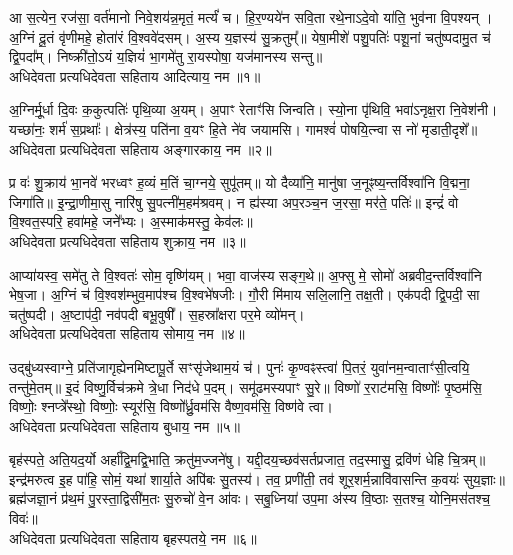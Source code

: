 

आ स॒त्येन॒ रज॑सा॒ वर्त॑मानो निवे॒शय॑न्न॒मृतं॒ मर्त्यं॑ च। हि॒र॒ण्यये॑न सवि॒ता रथे॒नाऽदे॒वो या॑ति॒ भुव॑ना वि॒पश्यन्। अ॒ग्निं दू॒तं वृ॑णीमहे॒ होता॑रं वि॒श्ववे॑दसम्। अ॒स्य य॒ज्ञस्य॑ सु॒क्रतुम्᳚॥ येषा॒मीशे॑ पशु॒पतिः॑ पशू॒नां चतु॑ष्पदामु॒त च॑ द्वि॒पदा᳚म्। निष्क्री॑तो॒ऽयं य॒ज्ञियं॑ भा॒गमे॑तु रा॒यस्पोषा॒ यज॑मानस्य सन्तु॥ \\
अधिदेवता प्रत्यधिदेवता सहिताय आदित्याय॒ नम॥१॥ 

अ॒ग्निर्मू॒र्धा दि॒वः क॒कुत्पतिः॑ पृथि॒व्या अ॒यम्। अ॒पाꣳ रेताꣳ॑सि जिन्वति। स्यो॒ना पृ॑थिवि॒ भवा॑ऽनृक्ष॒रा नि॒वेश॑नी। यच्छा॑नः॒ शर्म॑ स॒प्रथाः᳚। क्षेत्र॑स्य॒ पति॑ना व॒यꣳ हि॒ते ने॑व जयामसि। गामश्वं॑ पोषयि॒त्न्वा स नो॑ मृडाती॒दृशे᳚॥ \\
अधिदेवता प्रत्यधिदेवता सहिताय अङ्गारकाय॒ नम॥२॥ 

प्र वः॑ शु॒क्राय॑ भा॒नवे॑ भरध्वꣳ ह॒व्यं म॒तिं चा॒ग्नये॒ सुपू॑तम्॥ यो दैव्या॑नि॒ मानु॑षा ज॒नूꣴष्य॒न्तर्विश्वा॑नि वि॒द्मना॒ जिगा॑ति॥ इ॒न्द्रा॒णीमा॒सु नारि॑षु सु॒पत्नी॑म॒हम॑श्रवम्। न ह्य॑स्या अप॒रञ्च॒न ज॒रसा॒ मर॑ते॒ पतिः॑॥ इन्द्रं॑ वो वि॒श्वत॒स्परि॒ हवा॑महे॒ जने᳚भ्यः। अ॒स्माक॑मस्तु॒ केव॑लः॥ \\
अधिदेवता प्रत्यधिदेवता सहिताय शुक्राय॒ नम॥३॥ 

आप्या॑यस्व॒ समे॑तु ते वि॒श्वतः॑ सोम॒ वृष्णि॑यम्। भवा॒ वाज॑स्य सङ्ग॒थे॥ अ॒फ्सु मे॒ सोमो॑ अब्रवीद॒न्तर्विश्वा॑नि भेष॒जा। अ॒ग्निं च॑ वि॒श्वश॑म्भुव॒माप॑श्च वि॒श्वभे॑षजीः। गौ॒री मि॑माय सलि॒लानि॒ तक्ष॒ती। एक॑पदी द्वि॒पदी॒ सा चतु॑ष्पदी। अ॒ष्टाप॑दी॒ नव॑पदी बभू॒वुषी᳚। स॒हस्रा᳚क्षरा पर॒मे व्यो॑मन्। \\
अधिदेवता प्रत्यधिदेवता सहिताय सोमाय॒ नम॥४॥ 

उद्बु॑ध्यस्वाग्ने॒ प्रति॑जागृह्येनमिष्टापू॒र्ते सꣳसृ॑जेथाम॒यं च॑। पुनः॑ कृ॒ण्वꣴस्त्वा॑ पि॒तरं॒ युवा॑नम॒न्वाताꣳ॑सी॒त्वयि॒ तन्तु॑मे॒तम्॥ इ॒दं विष्णु॒र्विच॑क्रमे त्रे॒धा निद॑धे प॒दम्। समू॑ढमस्यपाꣳ सु॒रे॥ विष्णो॑ र॒राट॑मसि॒ विष्णोः᳚ पृ॒ष्ठम॑सि॒ विष्णोः॒ श्नप्त्रे᳚स्थो॒ विष्णोः॒ स्यूर॑सि॒ विष्णो᳚र्ध्रु॒वम॑सि वैष्ण॒वम॑सि॒ विष्ण॑वे त्वा। \\
अधिदेवता प्रत्यधिदेवता सहिताय बुधाय॒ नम॥५॥ 

बृह॑स्पते॒ अति॒यद॒र्यो अर्हा᳚द्वि॒मद्वि॒भाति॒ क्रतु॑म॒ज्जने॑षु। यद्दी॒दय॒च्छव॑सर्त\-प्रजात॒ तद॒स्मासु॒ द्रवि॑णं धेहि चि॒त्रम्॥ इन्द्र॑मरुत्व इ॒ह पा॑हि॒ सोमं॒ यथा॑ शार्या॒ते अपि॑बः सु॒तस्य॑। तव॒ प्रणी॑ती॒ तव॑ शूर॒शर्म॒न्नावि॑वासन्ति क॒वयः॑ सुय॒ज्ञाः॥ ब्रह्म॑जज्ञा॒नं प्र॑थ॒मं पु॒रस्ता॒द्विसी॑म॒तः सु॒रुचो॑ वे॒न आ॑वः। सबु॒ध्निया॑ उप॒मा अ॑स्य वि॒ष्ठाः स॒तश्च॒ योनि॒मस॑तश्च॒ विवः॑॥\\
अधिदेवता प्रत्यधिदेवता सहिताय बृहस्पतये॒ नम॥६॥ 

